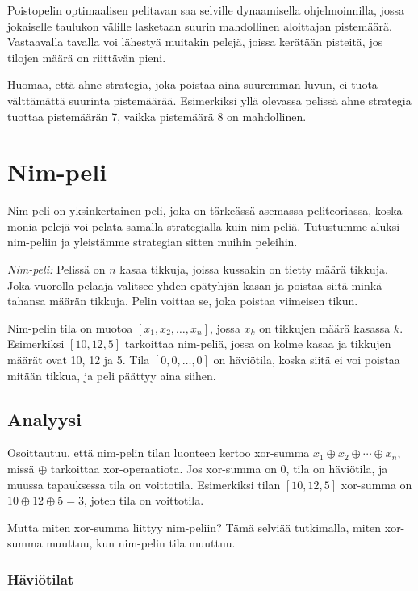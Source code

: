 Poistopelin optimaalisen pelitavan saa selville
dynaamisella ohjelmoinnilla, jossa jokaiselle
taulukon välille lasketaan suurin mahdollinen
aloittajan pistemäärä.
Vastaavalla tavalla voi lähestyä muitakin
pelejä, joissa kerätään pisteitä,
jos tilojen määrä on riittävän pieni.

Huomaa, että ahne strategia, joka poistaa aina
suuremman luvun, ei tuota välttämättä suurinta
pistemäärää. Esimerkiksi yllä olevassa pelissä
ahne strategia tuottaa pistemäärän 7,
vaikka pistemäärä 8 on mahdollinen.

\section{Nim-peli}

Nim-peli on yksinkertainen peli,
joka on tärkeässä asemassa peliteoriassa,
koska monia pelejä voi pelata samalla
strategialla kuin nim-peliä.
Tutustumme aluksi nim-peliin ja yleistämme
strategian sitten muihin peleihin.

\textit{Nim-peli:} Pelissä on $n$ kasaa tikkuja,
joissa kussakin on tietty määrä tikkuja.
Joka vuorolla pelaaja valitsee yhden epätyhjän kasan
ja poistaa siitä minkä tahansa määrän tikkuja.
Pelin voittaa se, joka poistaa viimeisen tikun.

Nim-pelin tila on muotoa $[x_1,x_2,\ldots,x_n]$,
jossa $x_k$ on tikkujen määrä kasassa $k$.
Esimerkiksi $[10,12,5]$ tarkoittaa nim-peliä,
jossa on kolme kasaa ja tikkujen määrät ovat 10, 12 ja 5.
Tila $[0,0,\ldots,0]$ on häviötila,
koska siitä ei voi poistaa mitään tikkua,
ja peli päättyy aina siihen.

\subsection{Analyysi}

Osoittautuu, että nim-pelin tilan luonteen
kertoo xor-summa $x_1 \oplus x_2 \oplus \cdots \oplus x_n$,
missä $\oplus$ tarkoittaa xor-operaatiota.
Jos xor-summa on 0, tila on häviötila,
ja muussa tapauksessa tila on voittotila.
Esimerkiksi tilan $[10,12,5]$ xor-summa on
$10 \oplus 12 \oplus 5 = 3$, joten tila on voittotila.

Mutta miten xor-summa liittyy nim-peliin?
Tämä selviää tutkimalla, miten xor-summa muuttuu,
kun nim-pelin tila muuttuu.

\subsubsection*{Häviötilat}

